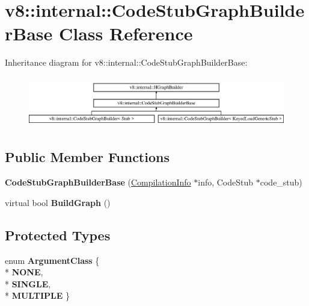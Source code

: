 \hypertarget{classv8_1_1internal_1_1_code_stub_graph_builder_base}{}\section{v8\+:\+:internal\+:\+:Code\+Stub\+Graph\+Builder\+Base Class Reference}
\label{classv8_1_1internal_1_1_code_stub_graph_builder_base}
Inheritance diagram for v8\+:\+:internal\+:\+:Code\+Stub\+Graph\+Builder\+Base\+:\begin{figure}[H]
\begin{center}
\leavevmode
\includegraphics[height=2.234043cm]{classv8_1_1internal_1_1_code_stub_graph_builder_base}
\end{center}
\end{figure}
\subsection*{Public Member Functions}
\begin{DoxyCompactItemize}
\item 
{\bfseries Code\+Stub\+Graph\+Builder\+Base} (\hyperlink{classv8_1_1internal_1_1_compilation_info}{Compilation\+Info} $\ast$info, Code\+Stub $\ast$code\+\_\+stub)\hypertarget{classv8_1_1internal_1_1_code_stub_graph_builder_base_ad1af8955490019ca79871379ff5b45af}{}\label{classv8_1_1internal_1_1_code_stub_graph_builder_base_ad1af8955490019ca79871379ff5b45af}

\item 
virtual bool {\bfseries Build\+Graph} ()\hypertarget{classv8_1_1internal_1_1_code_stub_graph_builder_base_adb8f28c53e03631c88ecb2c0ebfb3951}{}\label{classv8_1_1internal_1_1_code_stub_graph_builder_base_adb8f28c53e03631c88ecb2c0ebfb3951}

\end{DoxyCompactItemize}
\subsection*{Protected Types}
\begin{DoxyCompactItemize}
\item 
enum {\bfseries Argument\+Class} \{ \\*
{\bfseries N\+O\+NE}, 
\\*
{\bfseries S\+I\+N\+G\+LE}, 
\\*
{\bfseries M\+U\+L\+T\+I\+P\+LE}
 \}\hypertarget{classv8_1_1internal_1_1_code_stub_graph_builder_base_a0bb263d66bbbaf563618e4b55759a855}{}\label{classv8_1_1internal_1_1_code_stub_graph_builder_base_a0bb263d66bbbaf563618e4b55759a855}

\end{DoxyCompactItemize}
